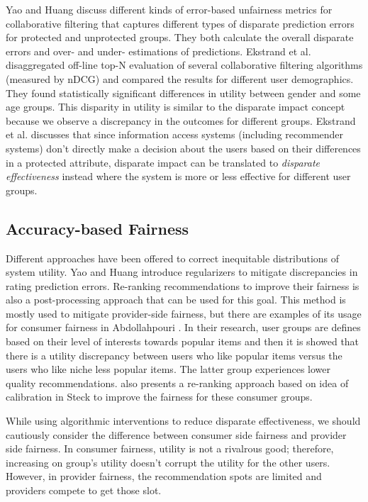     Yao and Huang \cite{yao_huang_fatml-2017} discuss different kinds of error-based unfairness metrics for collaborative filtering that captures different types of disparate prediction errors for protected and unprotected groups. They both calculate the overall disparate errors and over- and under- estimations of predictions. Ekstrand et al. \cite{ekstrand2018all} disaggregated off-line top-N evaluation of several collaborative filtering algorithms (measured by nDCG) and compared the results for different user demographics. They found statistically significant differences in utility between gender and some age groups. This disparity in utility is similar to the disparate impact concept because we observe a discrepancy in the outcomes for different groups. Ekstrand et al. \cite{ekstrand2021fairness} discusses that since information access systems (including recommender systems) don't directly make a decision about the users based on their differences in a protected attribute, disparate impact can be translated to \textit{disparate effectiveness} instead where the system is more or less effective for different user groups. 
    
    \subsection{Accuracy-based Fairness}
    Different approaches have been offered to correct inequitable distributions of system utility. Yao and Huang \cite{yao2017beyond} introduce regularizers to mitigate discrepancies in rating prediction errors. Re-ranking recommendations to improve their fairness is also a post-processing approach that can be used for this goal. This method is mostly used to mitigate provider-side fairness, but there are examples of its usage for consumer fairness in Abdollahpouri \cite{abdollahpouri2020popularity}. In their research, user groups are defines based on their level of interests towards popular items and then it is showed that there is a utility discrepancy between users who like popular items versus the users who like niche less popular items. The latter group experiences lower quality recommendations. \cite{abdollahpouri2020addressing} also presents a re-ranking approach based on idea of calibration in Steck \cite{steck2018calibrated} to improve the fairness for these consumer groups.
    
    While using algorithmic interventions to reduce disparate effectiveness, we should cautiously consider the difference between consumer side fairness and provider side fairness. In consumer fairness, utility is not a rivalrous good; therefore, increasing on group's utility doesn't corrupt the utility for the other users. However, in provider fairness, the recommendation spots are limited and providers compete to get those slot. 
    
